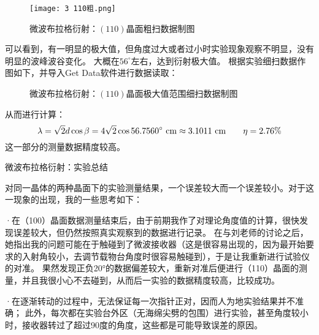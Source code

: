 \documentclass[11pt]{article}
\begin{document}
\begin{figure}[H]
    \centering
    \texttt{[image: 3 110粗.png]}
    \caption{微波布拉格衍射：$(110)$晶面粗扫数据制图}
\end{figure}

可以看到，有一明显的极大值，但角度过大或者过小时实验现象观察不明显，没有明显的波峰波谷变化。
大概在$56^{\circ}$左右，达到衍射极大值。
根据实验细扫数据作图如下，并导入Get Data软件进行数据读取：
\begin{figure}[H]
    \centering
    \hspace{0.5cm}
    \caption{微波布拉格衍射：$(110)$晶面极大值范围细扫数据制图}
\end{figure}

从而进行计算：
\begin{displaymath}
    \lambda=\sqrt2d\cos \beta=4\sqrt 2\cos 56.7560^{\circ}\,\, {\rm cm} \approx3.1011\,\, {\rm cm}
\qquad \eta=2.76\%
\end{displaymath}
这一部分的测量数据精度较高。

\begin{center}
    \begin{tcolorbox}[colback=gray!10,%
                      colframe=black,%
                      width=5.5cm,%
                      arc=1mm, auto outer arc,
                      boxrule=0.5pt,]
\begin{center}                     
  微波布拉格衍射：实验总结
\end{center}
    \end{tcolorbox}
\end{center}

对同一晶体的两种晶面下的实验测量结果，一个误差较大而一个误差较小。对于这一现象的出现，我的一些思考如下：

·在（100）晶面数据测量结束后，由于前期我作了对理论角度值的计算，很快发现误差较大，但仍然按照真实观察到的数据进行记录。
在与刘老师的讨论之后，她指出我的问题可能在于触碰到了微波接收器（这是很容易出现的，因为最开始要求的入射角较小，去调节载物台角度时很容易触碰到），于是让我重新进行试验仪的对准。
果然发现正负20°的数据偏差较大，重新对准后便进行（110）晶面的测量，并且我很小心不去碰到，从而后一实验的数据精度较高，比较成功。

·在逐渐转动的过程中，无法保证每一次指针正对，因而人为地实验结果并不准确；
此外，每次都在实验台外区（无海绵尖劈的包围）进行实验，甚至角度较小时，接收器转过了超过90度的角度，这些都是可能导致误差的原因。
\end{document}
